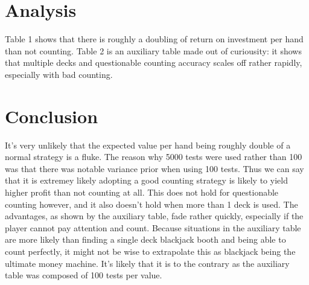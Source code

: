 \documentclass[11pt,letterpaper]{article}
\begin{document}
\part{Analysis}
Table 1 shows that there is roughly a doubling of return on investment per hand than not counting. Table 2 is an auxiliary table made out of curiousity: it shows that multiple decks and questionable counting accuracy scales off rather rapidly, especially with bad counting. 
\part{Conclusion}
It's very unlikely that the expected value per hand being roughly double of a normal strategy is a fluke. The reason why 5000 tests were used rather than 100 was that there was notable variance prior when using 100 tests. Thus we can say that it is extremey likely adopting a good counting strategy is likely to yield higher profit than not counting at all. This does not hold for questionable counting however, and it also doesn't hold when more than 1 deck is used. The advantages, as shown by the auxiliary table, fade rather quickly, especially if the player cannot pay attention and count. Because situations in the auxiliary table are more likely than finding a single deck blackjack booth and being able to count perfectly, it might not be wise to extrapolate this as blackjack being the ultimate money machine. It's likely that it is to the contrary as the auxiliary table was composed of 100 tests per value.
\end{document}
